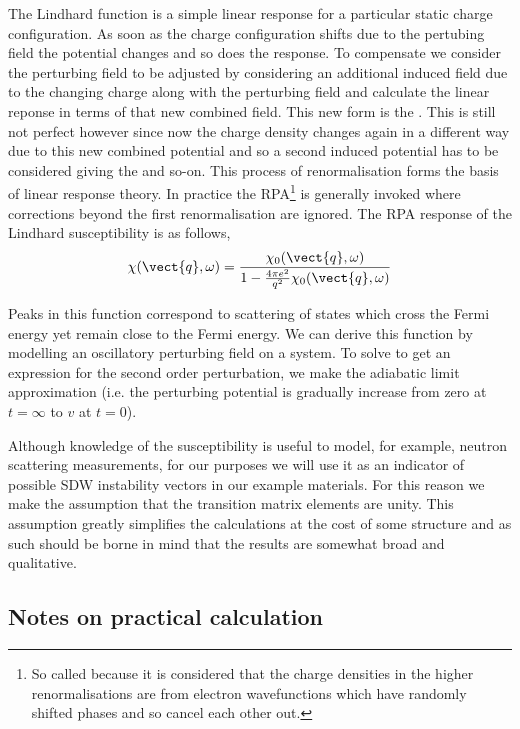 The Lindhard function is a simple linear response for a particular static charge configuration. As soon as the charge configuration shifts due to the pertubing field the potential changes and so does the response. To compensate we consider the perturbing field to be adjusted by considering an additional induced field due to the changing charge along with the perturbing field and calculate the linear reponse in terms of that new combined field. This new form is the . This is still not perfect however since now the charge density changes again in a different way due to this new combined potential and so a second induced potential has to be considered giving the  and so-on. This process of renormalisation forms the basis of linear response theory. In practice the \ac{RPA}\footnote{So called because it is considered that the charge densities in the higher renormalisations are from electron wavefunctions which have randomly shifted phases and so cancel each other out.} is generally invoked where corrections beyond the first renormalisation are ignored. The \ac{RPA} response of the Lindhard susceptibility is as follows,
\begin{equation}
    \chi(\vect{q},\omega) = \frac{\chi_0(\vect{q}, \omega)}{1 - \frac{4\pi e^2}{q^2} \chi_0(\vect{q}, \omega)}
\end{equation}


Peaks in this function correspond to scattering of states which cross the Fermi energy yet remain close to the Fermi energy.  We can derive this function by modelling an oscillatory perturbing field on a system. To solve to get an expression for the second order perturbation, we make the adiabatic limit approximation (i.e. the perturbing potential is gradually increase from zero at $t=\infty$ to $v$ at $t=0$).


Although knowledge of the susceptibility is useful to model, for example, neutron scattering measurements, for our purposes we will use it as an indicator of possible \ac{SDW} instability vectors in our example materials. For this reason we make the assumption that the transition matrix elements are unity. This assumption greatly simplifies the calculations at the cost of some structure and as such should be borne in mind that the results are somewhat broad and qualitative.


\subsection{Notes on practical calculation}

